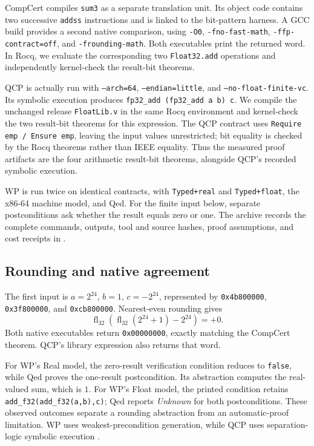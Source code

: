 \documentclass[manuscript, screen, review]{acmart}
\begin{document}
CompCert compiles \texttt{sum3} as a separate translation unit. Its object
code contains two successive \texttt{addss} instructions and is linked to
the bit-pattern harness. A GCC build provides a second native comparison,
using \texttt{-O0}, \texttt{-fno-fast-math}, \texttt{-ffp-contract=off},
and \texttt{-frounding-math}. Both executables print the returned word.
In Rocq, we evaluate the corresponding two \texttt{Float32.add}
operations and independently kernel-check the result-bit theorems.

QCP is actually run with \texttt{--arch=64}, \texttt{--endian=little},
and \texttt{--no-float-finite-vc}. Its symbolic execution produces
\texttt{fp32\_add (fp32\_add a b) c}. We compile the unchanged release
\texttt{FloatLib.v} in the same Rocq environment and kernel-check the two
result-bit theorems for this expression. The QCP contract uses
\texttt{Require emp / Ensure emp}, leaving the input values unrestricted;
bit equality is checked by the Rocq theorems rather than IEEE equality.
Thus the measured proof artifacts are the four arithmetic result-bit
theorems, alongside QCP's recorded symbolic execution.

WP is run twice on identical contracts, with \texttt{Typed+real} and
\texttt{Typed+float}, the x86-64 machine model, and Qed. For the finite
input below, separate postconditions ask whether the result equals zero
or one. The archive records the complete commands, outputs, tool and
source hashes, proof assumptions, and cost receipts in
.

\subsection{Rounding and native agreement}

The first input is $a=2^{24}$, $b=1$, $c=-2^{24}$, represented by
\texttt{0x4b800000}, \texttt{0x3f800000}, and \texttt{0xcb800000}.
Nearest-even rounding gives
\[
 \operatorname{fl}_{32}(\operatorname{fl}_{32}(2^{24}+1)-2^{24})=+0.
\]
Both native executables return \texttt{0x00000000}, exactly matching the
CompCert theorem. QCP's library expression also returns that word.

For WP's Real model, the zero-result verification condition reduces to
\texttt{false}, while Qed proves the one-result postcondition. Its
abstraction computes the real-valued sum, which is $1$. For WP's Float
model, the printed condition retains
\texttt{add\_f32(add\_f32(a,b),c)}; Qed reports \emph{Unknown} for both
postconditions. These observed outcomes separate a rounding abstraction
from an automatic-proof limitation. WP uses weakest-precondition
generation, while QCP uses separation-logic symbolic execution
\cite{FramaCWPManual,WuEtAl2026}.
\end{document}
